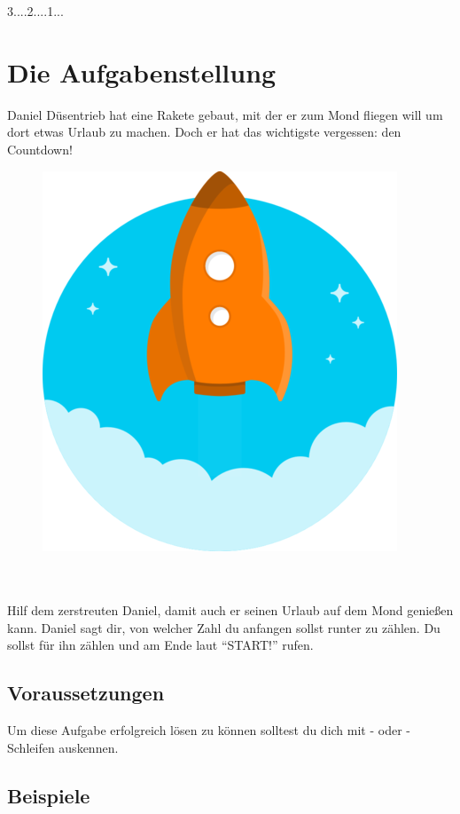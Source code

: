 \documentclass{\VorlagenPfad/coderdojokatext}
\newcommand{\Titel}{3....2....1...}
\begin{document}
	\setcounter{chapter}{1}
	
	\begin{center}
		{\huge \Titel}
	\end{center}
	
	\section{Die Aufgabenstellung} Daniel Düsentrieb hat eine Rakete gebaut, mit der er zum Mond fliegen will um dort etwas Urlaub zu machen. Doch er hat das wichtigste vergessen: den Countdown!
	\\
	\begin{figure}[h]
	\includegraphics[scale=0.8]{rakete}
	\centering
	\end{figure}
	\\ \\
	Hilf dem zerstreuten Daniel, damit auch er seinen Urlaub auf dem Mond genießen kann. Daniel sagt dir, von welcher Zahl du anfangen sollst runter zu zählen. Du sollst für ihn zählen und am Ende laut "`START!"' rufen.
	
	\subsection{Voraussetzungen} Um diese Aufgabe erfolgreich lösen zu können solltest du dich mit - oder -Schleifen auskennen.
	
	\subsection{Beispiele}
\end{document}
